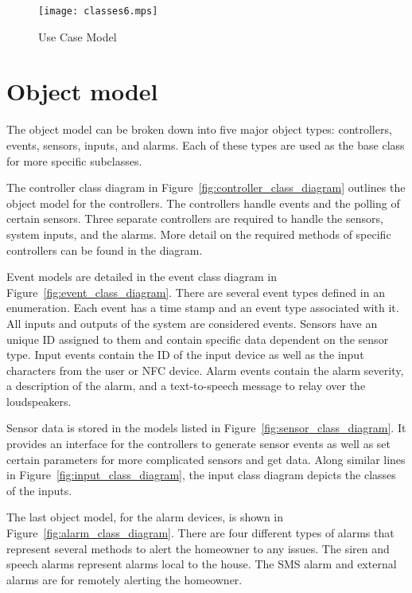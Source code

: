 \documentclass{report}
\begin{document}
\setlength{\parindent}{\originalParindent}
\setlength{\parskip}{\originalParskip}

\begin{figure}[hp]
    \centering
        \caption{Use Case Model}
        \scriptsize
        \setlength{\unitlength}{2.0em}
        \texttt{[image: classes6.mps]}
        \normalsize
    \label{fig:use_case_model}
\end{figure}
\pagebreak

\section{Object model}
The object model can be broken down into five major object types: controllers,
events, sensors, inputs, and alarms. Each of these types are used as the base
class for more specific subclasses.

The controller class diagram in Figure~\ref{fig:controller_class_diagram}
outlines the object model for the controllers. The controllers handle events
and the polling of certain sensors. Three separate controllers are required to
handle the sensors, system inputs, and the alarms. More detail on the required
methods of specific controllers can be found in the diagram.

Event models are detailed in the event class diagram in
Figure~\ref{fig:event_class_diagram}. There are several event types defined in
an enumeration. Each event has a time stamp and an event type associated with
it. All inputs and outputs of the system are considered events. Sensors have an
unique ID assigned to them and contain specific data dependent on the sensor
type. Input events contain the ID of the input device as well as the input
characters from the user or NFC device. Alarm events contain the alarm
severity, a description of the alarm, and a text-to-speech message to relay
over the loudspeakers.

Sensor data is stored in the models listed in
Figure~\ref{fig:sensor_class_diagram}. It provides an interface for the
controllers to generate sensor events as well as set certain parameters for
more complicated sensors and get data. Along similar lines in
Figure~\ref{fig:input_class_diagram}, the input class diagram depicts the
classes of the inputs.

The last object model, for the alarm devices, is shown in
Figure~\ref{fig:alarm_class_diagram}. There are four different types of alarms
that represent several methods to alert the homeowner to any issues. The siren
and speech alarms represent alarms local to the house. The SMS alarm and
external alarms are for remotely alerting the homeowner. 
\end{document}
